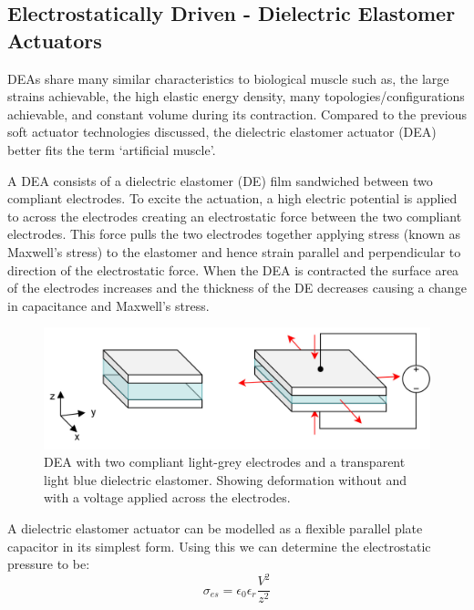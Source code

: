 \subsection{Electrostatically Driven - Dielectric Elastomer Actuators}
\label{subsec:DEA}
DEAs share many similar characteristics to biological muscle such as, the large strains achievable, the high elastic energy density, many topologies/configurations achievable, and constant volume during its contraction. Compared to the previous soft actuator technologies discussed, the dielectric elastomer actuator (DEA) better fits the term `artificial muscle'. 

A DEA consists of a dielectric elastomer (DE) film sandwiched between two compliant electrodes. To excite the actuation, a high electric potential is applied to across the electrodes creating an electrostatic force between the two compliant electrodes. This force pulls the two electrodes together applying stress (known as Maxwell's stress) to the elastomer and hence strain parallel and perpendicular to direction of the electrostatic force. When the DEA is contracted the surface area of the electrodes increases and the thickness of the DE decreases causing a change in capacitance and Maxwell's stress.
\begin{figure}[H]
	\centering
	\includegraphics[width=0.7\linewidth]{Figures/dea_square_2state.jpg}
	\caption{DEA with two compliant light-grey electrodes and a transparent light blue dielectric elastomer. Showing deformation without and with a voltage applied across the electrodes.}
	\label{fig:Artificial Muscle_DEA}
\end{figure}
A dielectric elastomer actuator can be modelled as a flexible parallel plate capacitor in its simplest form. Using this we can determine the electrostatic pressure to be:
\begin{equation}
	\sigma_{es} = \epsilon_0 \epsilon_r \frac{V^2}{z^2}
\end{equation}
